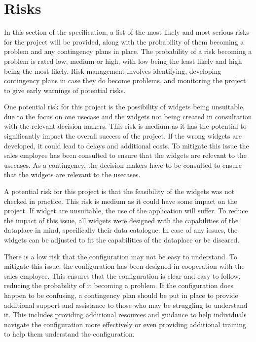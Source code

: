 \chapter{Risks}

In this section of the specification, a list of the most likely and most serious risks for the project will be provided, along with the probability of them becoming a problem and any contingency plans in place. The probability of a risk becoming a problem is rated low, medium or high, with low being the least likely and high being the most likely. Risk management involves identifying, developing contingency plans in case they do become problems, and monitoring the project to give early warnings of potential risks.

One potential risk for this project is the possibility of \glspl{widget} being unsuitable, due to the focus on one \gls{usecase} and the \glspl{widget} not being created in consultation with the relevant decision makers. This risk is medium as it has the potential to significantly impact the overall success of the project. If the wrong \glspl{widget} are developed, it could lead to delays and additional costs. To mitigate this issue the sales employee has been consulted to ensure that the \glspl{widget} are relevant to the \glspl{usecase}. As a contingency, the decision makers have to be consulted to ensure that the \glspl{widget} are relevant to the \glspl{usecase}.

A potential risk for this project is that the feasibility of the \glspl{widget} was not checked in practice. This risk is medium as it could have some impact on the project. If \gls{widget} are unsuitable, the use of the application will suffer. To reduce the impact of this issue, all \glspl{widget} were designed with the capabilities of the \gls{dataplace} in mind, specifically their data catalogue. In case of any issues, the \glspl{widget} can be adjusted to fit the capabilities of the \gls{dataplace} or be discared.

There is a low risk that the configuration may not be easy to understand. To mitigate this issue, the configuration has been designed in cooperation with the sales employee. This ensures that the configuration is clear and easy to follow, reducing the probability of it becoming a problem. If the configuration does happen to be confusing, a contingency plan should be put in place to provide additional support and assistance to those who may be struggling to understand it. This includes providing additional resources and guidance to help individuals navigate the configuration more effectively or even providing additional training to help them understand the configuration.

